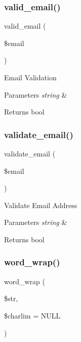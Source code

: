 \subsubsection{\texorpdfstring{valid\+\_\+email()}{valid\_email()}}
{\footnotesize\ttfamily valid\+\_\+email (\begin{DoxyParamCaption}\item[{}]{\$email }\end{DoxyParamCaption})}

Email Validation


\begin{DoxyParams}{Parameters}
{\em string} & \\
\hline
\end{DoxyParams}
\begin{DoxyReturn}{Returns}
bool 
\end{DoxyReturn}
\mbox{\label{class_c_i___email_a1907f0dba44e2968b8260dbc5770550f}} 
\subsubsection{\texorpdfstring{validate\+\_\+email()}{validate\_email()}}
{\footnotesize\ttfamily validate\+\_\+email (\begin{DoxyParamCaption}\item[{}]{\$email }\end{DoxyParamCaption})}

Validate Email Address


\begin{DoxyParams}{Parameters}
{\em string} & \\
\hline
\end{DoxyParams}
\begin{DoxyReturn}{Returns}
bool 
\end{DoxyReturn}
\mbox{\label{class_c_i___email_aa3a2a5440115b320a0c2fcea542e546a}} 
\subsubsection{\texorpdfstring{word\+\_\+wrap()}{word\_wrap()}}
{\footnotesize\ttfamily word\+\_\+wrap (\begin{DoxyParamCaption}\item[{}]{\$str,  }\item[{}]{\$charlim = {\ttfamily NULL} }\end{DoxyParamCaption})}

